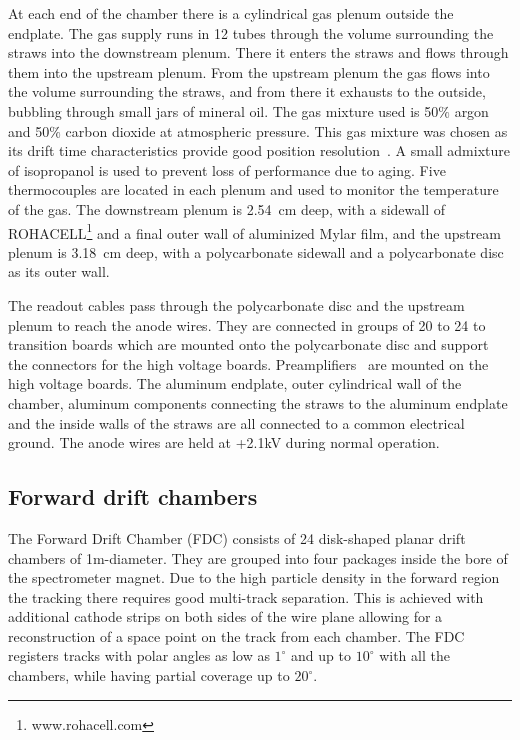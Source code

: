 At each end of the chamber there is a cylindrical gas plenum outside the endplate.  
The gas supply runs in 12 tubes through the volume surrounding the straws into the downstream plenum. 
There it enters the straws and flows through them into the upstream plenum. From the upstream plenum the gas flows into the volume surrounding the straws, and from there it exhausts to the outside, bubbling through small jars of mineral oil.
The gas mixture used is 50$\%$ argon and 50$\%$ carbon dioxide at atmospheric pressure. 
This gas mixture was chosen as its drift time characteristics provide good position resolution~\cite{VanHaarlem:2010yq}.
A small admixture of isopropanol is used to prevent loss of performance due to aging\cite{KADYK1991436,VAVRA20031}. 
Five thermocouples are located in each plenum and used to monitor the temperature of the gas.
The downstream plenum is 2.54~cm deep, with a sidewall of ROHACELL\footnote{www.rohacell.com} and a final outer wall of aluminized Mylar film, and the upstream plenum is 3.18~cm deep, with a polycarbonate sidewall and a polycarbonate disc as its outer wall. 

The readout cables pass through the polycarbonate disc and the upstream plenum to reach the anode wires. 
They are connected in groups of 20 to 24 to transition boards which are mounted onto the polycarbonate disc and support the connectors for the high voltage boards. 
Preamplifiers~\cite{hdnote2515} are mounted on the high voltage boards. The aluminum endplate, outer cylindrical wall of the chamber, aluminum components connecting the straws to the aluminum endplate and the inside walls of the straws are all connected to a common electrical ground. 
The anode wires are held at +2.1kV during normal operation. 


\subsection[Forward drift chambers]{Forward drift chambers
\label{sec:fdc} }

The Forward Drift Chamber (FDC) consists of 24 disk-shaped planar drift chambers of 1m-diameter.
They are grouped into four packages inside the bore of the spectrometer magnet.
Due to the high particle density in the forward region the tracking there requires
good multi-track separation.
This is achieved with additional cathode strips on both sides of the wire plane allowing for a  reconstruction of a space point on the track from each chamber. 
The FDC registers tracks with polar angles as low as $1^\circ$ and up to $10^\circ $
with all the chambers, while having partial coverage up to $20^\circ$.

